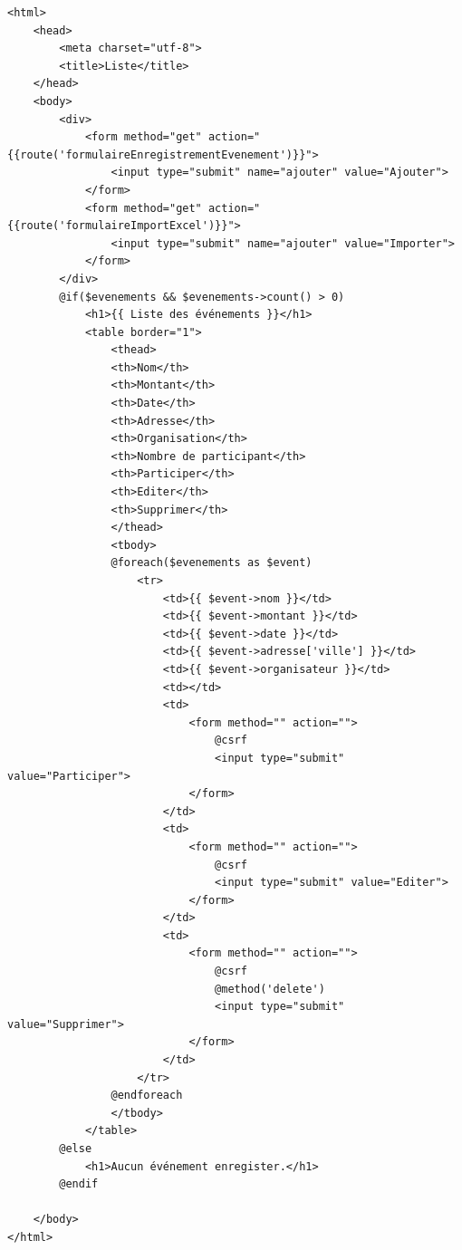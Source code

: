 \documentclass[12pt,a4paper]{article}
\begin{document}
\begin{verbatim}
<html>
    <head>
        <meta charset="utf-8">
        <title>Liste</title>
    </head>
    <body>
        <div>
            <form method="get" action="{{route('formulaireEnregistrementEvenement')}}">
                <input type="submit" name="ajouter" value="Ajouter">
            </form>
            <form method="get" action="{{route('formulaireImportExcel')}}">
                <input type="submit" name="ajouter" value="Importer">
            </form>
        </div>
        @if($evenements && $evenements->count() > 0)
            <h1>{{ Liste des événements }}</h1>
            <table border="1">
                <thead>
                <th>Nom</th>
                <th>Montant</th>
                <th>Date</th>
                <th>Adresse</th>
                <th>Organisation</th>
                <th>Nombre de participant</th>
                <th>Participer</th>
                <th>Editer</th>
                <th>Supprimer</th>
                </thead>
                <tbody>
                @foreach($evenements as $event)
                    <tr>
                        <td>{{ $event->nom }}</td>
                        <td>{{ $event->montant }}</td>
                        <td>{{ $event->date }}</td>
                        <td>{{ $event->adresse['ville'] }}</td>
                        <td>{{ $event->organisateur }}</td>
                        <td></td>
                        <td>
                            <form method="" action="">
                                @csrf
                                <input type="submit" value="Participer">
                            </form>
                        </td>
                        <td>
                            <form method="" action="">
                                @csrf
                                <input type="submit" value="Editer">
                            </form>
                        </td>
                        <td>
                            <form method="" action="">
                                @csrf
                                @method('delete')
                                <input type="submit" value="Supprimer">
                            </form>
                        </td>
                    </tr>
                @endforeach
                </tbody>
            </table>
        @else
            <h1>Aucun événement enregister.</h1>
        @endif

    </body>
</html>

\end{verbatim}
\end{document}
